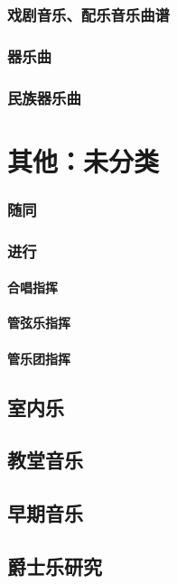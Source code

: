 \documentclass[UTF8]{../RepresentationUniverse}
\begin{document}
    \subsection{戏剧音乐、配乐音乐曲谱}
    \subsection{器乐曲}
    \subsection{民族器乐曲} 


\chapter{其他：未分类}

    \subsection{随同}
    \subsection{进行}
        \subsubsection{合唱指挥}
        \subsubsection{管弦乐指挥}
        \subsubsection{管乐团指挥}


    \section{室内乐}
    \section{教堂音乐}

    \section{早期音乐}

    \section{爵士乐研究}
\end{document}
